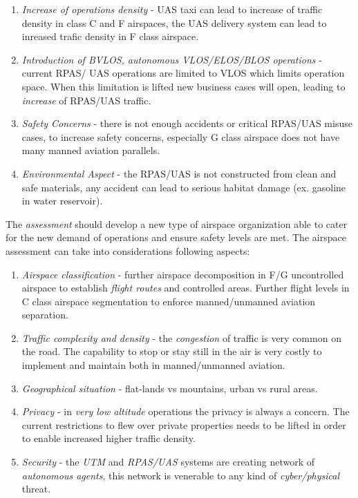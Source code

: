 \begin{enumerate}
    \item \emph{Increase of operations density} - UAS taxi can lead to increase of traffic density in class C and F airspaces, the UAS delivery system can lead to inreased trafic density in F class airspace. 
    
    \item \emph{Introduction of BVLOS, autonomous VLOS/ELOS/BLOS operations} - current RPAS/ UAS operations are limited to VLOS which limits operation space. When this limitation is lifted new business cases will open, leading to \emph{increase} of RPAS/UAS traffic.
    
    \item \emph{Safety Concerns} - there is not enough accidents or critical RPAS/UAS misuse cases, to increase safety concerns, especially G class airspace does not have many manned aviation parallels.
    
    \item \emph{Environmental Aspect} - the RPAS/UAS is not constructed from clean and safe materials, any accident can lead to serious habitat damage (ex. gasoline in water reservoir).
\end{enumerate}

The \emph{assessment} should develop a new type of airspace organization able to cater for the new demand of operations and ensure safety levels are met. The airspace assessment can take into considerations following aspects:

\begin{enumerate}
    \item \emph{Airspace classification} - further airspace decomposition in F/G  uncontrolled airspace to establish \emph{flight routes} and controlled areas. Further flight levels in C class airspace segmentation to enforce manned/unmanned aviation separation.
    
    \item \emph{Traffic complexity and density} - the \emph{congestion} of traffic is very common on the road. The capability to stop or stay still in the air is very costly to implement and maintain both in manned/unmanned aviation.
    
    \item \emph{Geographical situation} - flat-lands vs mountains, urban vs rural areas.
    
    \item \emph{Privacy} - in \emph{very low altitude} operations the privacy is always a concern.  The current restrictions to flew over private properties needs to be lifted in order to enable increased higher traffic density.
    
    \item \emph{Security} - the \emph{UTM} and \emph{RPAS/UAS} systems are creating network of \emph{autonomous agents}, this network is venerable to any kind of \emph{cyber/physical} threat.
\end{enumerate}

